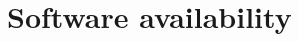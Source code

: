\documentclass[final,1p,times]{elsarticle}
\begin{document}



\section{Software availability}
\end{document}
